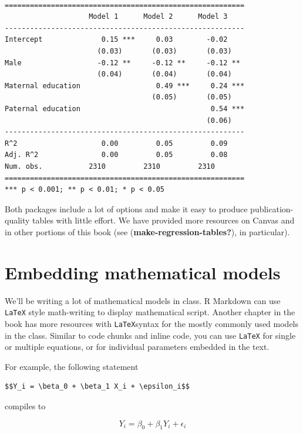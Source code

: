 \documentclass[
  letterpaper,
  DIV=11,
  numbers=noendperiod]{scrreprt}
\begin{document}
\begin{verbatim}

=========================================================
                    Model 1      Model 2      Model 3    
---------------------------------------------------------
Intercept              0.15 ***     0.03        -0.02    
                      (0.03)       (0.03)       (0.03)   
Male                  -0.12 **     -0.12 **     -0.12 ** 
                      (0.04)       (0.04)       (0.04)   
Maternal education                  0.49 ***     0.24 ***
                                   (0.05)       (0.05)   
Paternal education                               0.54 ***
                                                (0.06)   
---------------------------------------------------------
R^2                    0.00         0.05         0.09    
Adj. R^2               0.00         0.05         0.08    
Num. obs.           2310         2310         2310       
=========================================================
*** p < 0.001; ** p < 0.01; * p < 0.05
\end{verbatim}

Both packages include a lot of options and make it easy to produce
publication-quality tables with little effort. We have provided more
resources on Canvas and in other portions of this book (see
(\textbf{make-regression-tables?}), in particular).

\section{Embedding mathematical
models}\label{embedding-mathematical-models}

We'll be writing a lot of mathematical models in class. R Markdown can
use \texttt{LaTeX} style math-writing to display mathematical script.
Another chapter in the book has more resources with \texttt{LaTeX}syntax
for the mostly commonly used models in the class. Similar to code chunks
and inline code, you can use \texttt{LaTeX} for single or multiple
equations, or for individual parameters embedded in the text.

For example, the following statement

\begin{verbatim}
$$Y_i = \beta_0 + \beta_1 X_i + \epsilon_i$$
\end{verbatim}

compiles to

\[Y_i = \beta_0 + \beta_1 Y_i + \epsilon_i\]
\end{document}
